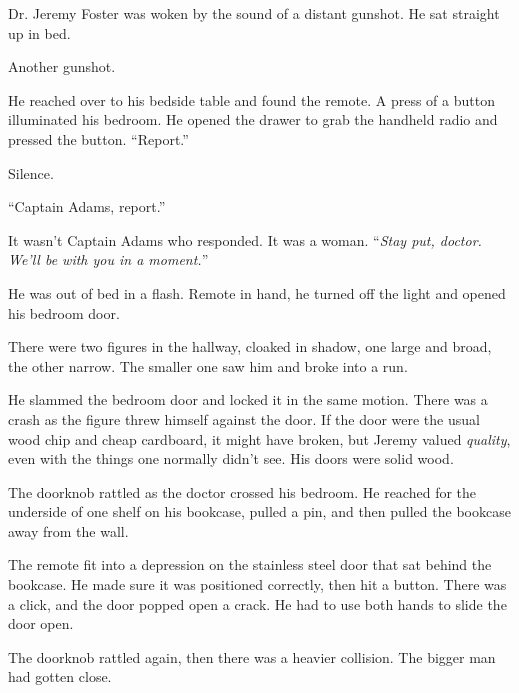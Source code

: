 





Dr. Jeremy Foster was woken by the sound of a distant gunshot.  He sat straight up in bed.



Another gunshot.



He reached over to his bedside table and found the remote.  A press of a button illuminated his bedroom.  He opened the drawer to grab the handheld radio and pressed the button.  ``Report.''



Silence.



``Captain Adams, report.''



It wasn't Captain Adams who responded.  It was a woman.  ``\emph{Stay put, doctor.  We'll be with you in a moment.}''



He was out of bed in a flash.  Remote in hand, he turned off the light and opened his bedroom door.



There were two figures in the hallway, cloaked in shadow, one large and broad, the other narrow.  The smaller one saw him and broke into a run.



He slammed the bedroom door and locked it in the same motion.  There was a crash as the figure threw himself against the door.  If the door were the usual wood chip and cheap cardboard, it might have broken, but Jeremy valued \emph{quality}, even with the things one normally didn't see.  His doors were solid wood.



The doorknob rattled as the doctor crossed his bedroom.  He reached for the underside of one shelf on his bookcase, pulled a pin, and then pulled the bookcase away from the wall.



The remote fit into a depression on the stainless steel door that sat behind the bookcase.  He made sure it was positioned correctly, then hit a button.  There was a click, and the door popped open a crack.  He had to use both hands to slide the door open.



The doorknob rattled again, then there was a heavier collision.  The bigger man had gotten close.



